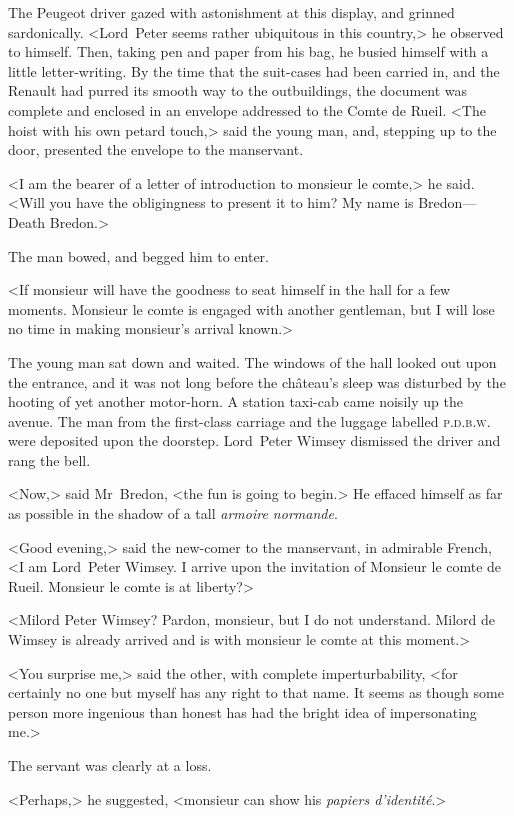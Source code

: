 The Peugeot driver gazed with astonishment at this display, and grinned sardonically. <Lord~Peter seems rather ubiquitous in this country,> he observed to himself. Then, taking pen and paper from his bag, he busied himself with a little letter-writing. By the time that the suit-cases had been carried in, and the Renault had purred its smooth way to the outbuildings, the document was complete and enclosed in an envelope addressed to the Comte de Rueil. <The hoist with his own petard touch,> said the young man, and, stepping up to the door, presented the envelope to the manservant.

<I am the bearer of a letter of introduction to monsieur le comte,> he said. <Will you have the obligingness to present it to him? My name is Bredon—Death Bredon.>

The man bowed, and begged him to enter.

<If monsieur will have the goodness to seat himself in the hall for a few moments. Monsieur le comte is engaged with another gentleman, but I will lose no time in making monsieur's arrival known.>

The young man sat down and waited. The windows of the hall looked out upon the entrance, and it was not long before the château's sleep was disturbed by the hooting of yet another motor-horn. A station taxi-cab came noisily up the avenue. The man from the first-class carriage and the luggage labelled \textsc{p.d.b.w.} were deposited upon the doorstep. Lord~Peter Wimsey dismissed the driver and rang the bell.

<Now,> said Mr~Bredon, <the fun is going to begin.> He effaced himself as far as possible in the shadow of a tall \textit{armoire normande}.

<Good evening,> said the new-comer to the manservant, in admirable French, <I am Lord~Peter Wimsey. I arrive upon the invitation of Monsieur le comte de Rueil. Monsieur le comte is at liberty?>

<Milord Peter Wimsey? Pardon, monsieur, but I do not understand. Milord de Wimsey is already arrived and is with monsieur le comte at this moment.>

<You surprise me,> said the other, with complete imperturbability, <for certainly no one but myself has any right to that name. It seems as though some person more ingenious than honest has had the bright idea of impersonating me.>

The servant was clearly at a loss.

<Perhaps,> he suggested, <monsieur can show his \textit{papiers d'identité}.>

